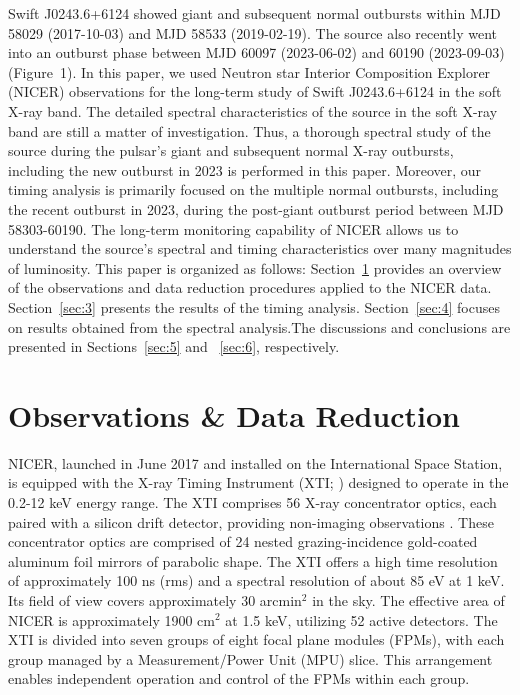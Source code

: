 \documentclass[twocolumn,trackchanges]{aastex631}
\begin{document}
Swift J0243.6+6124 showed giant and subsequent normal outbursts within MJD 58029 (2017-10-03) and MJD 58533 (2019-02-19). The source also recently went into an outburst phase between MJD 60097 (2023-06-02) and 60190 (2023-09-03) (Figure~1). In this paper, we used Neutron star Interior Composition Explorer (NICER) observations for the long-term study of Swift J0243.6+6124 in the soft X-ray band.  The detailed spectral characteristics of the source in the soft X-ray band are still a matter of investigation. Thus,  a thorough spectral study of the source during the pulsar's giant and subsequent normal X-ray outbursts, including the new outburst in 2023 is performed in this paper. Moreover, our timing analysis is primarily focused on the multiple normal outbursts, including the recent outburst in 2023, during the post-giant outburst period between MJD 58303-60190. The long-term monitoring capability of NICER allows us to understand the source's spectral and timing characteristics over many magnitudes of luminosity. This paper is organized as follows: Section~\ref{sec:2} provides an overview of the observations and data reduction procedures applied to the NICER data. Section~\ref{sec:3} presents the results of the timing analysis. Section~\ref{sec:4} focuses on results obtained from the spectral analysis.The  discussions and conclusions are presented in Sections~\ref{sec:5} and ~\ref{sec:6}, respectively.




\section{ Observations \& Data Reduction}
\label{sec:2}

NICER, launched in June 2017 and installed on the International Space Station, is equipped with the X-ray Timing Instrument (XTI; \citet{2016SPIE.9905E..1HG}) designed to operate in the 0.2-12 keV energy range. The XTI comprises 56 X-ray concentrator optics, each paired with a silicon drift detector, providing non-imaging observations \citep{2016SPIE.9905E..1IP}. These concentrator optics are comprised of 24 nested grazing-incidence gold-coated aluminum foil mirrors of parabolic shape. The XTI offers a high time resolution of approximately 100 ns (rms) and a spectral resolution of about 85 eV at 1 keV. Its field of view covers approximately 30 arcmin$^{2}$ in the sky. The effective area of NICER is approximately 1900 cm$^{2}$ at 1.5 keV, utilizing 52 active detectors. The XTI is divided into seven groups of eight focal plane modules (FPMs), with each group managed by a Measurement/Power Unit (MPU) slice. This arrangement enables independent operation and control of the FPMs within each group. 
\end{document}
